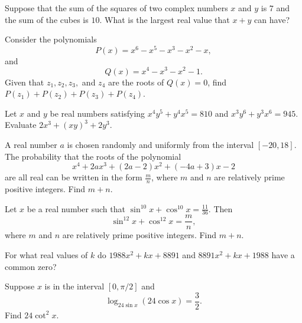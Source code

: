 \begin{question}[name={1983 AIME}]
    Suppose that the sum of the squares of two complex numbers $x$ and $y$ is $7$ and the sum of the cubes is $10$. What is the largest real value that $x + y$ can have?
\end{question}

\begin{question}[name={2003 AIME}]
    Consider the polynomials \[P(x)=x^{6}-x^{5}-x^{3}-x^{2}-x,\] and \[Q(x)=x^{4}-x^{3}-x^{2}-1.\] Given that $z_{1},z_{2},z_{3},$ and $z_{4}$ are the roots of $Q(x)=0$, find $P(z_{1})+P(z_{2})+P(z_{3})+P(z_{4})$.
\end{question}

\begin{question}[name={2015 AIME}]
    Let $x$ and $y$ be real numbers satisfying $x^4y^5+y^4x^5=810$ and $x^3y^6+y^3x^6=945$. Evaluate $2x^3+(xy)^3+2y^3$.	
\end{question}


\begin{question}[name={2018 AIME}]
    A real number $a$ is chosen randomly and uniformly from the interval $[-20, 18]$. The probability that the roots of the polynomial\[x^4 + 2ax^3 + (2a-2)x^2 + (-4a+3)x - 2\]are all real can be written in the form $\tfrac{m}{n}$, where $m$ and $n$ are relatively prime positive integers. Find $m+n$.
\end{question}

\begin{question}[name={2019 AIME}]
    Let $x$ be a real number such that $\sin^{10}x+\cos^{10} x = \tfrac{11}{36}$. Then 
    \[\sin^{12}x+\cos^{12} x = \dfrac{m}{n},\] where $m$ and $n$ are relatively prime positive integers. Find $m+n$.
\end{question}

\begin{question}[name={1988 Canada}]
    For what real values of $k$ do $1988x^2 + kx + 8891$ and $8891x^2 + kx + 1988$ have a common zero?
\end{question}

\begin{question}[name={2011 AIME I \#9}]
    Suppose $x$ is in the interval $[0,\pi/2]$ and \[\log_{24\sin{x}}(24\cos{x})=\frac{3}{2}.\] Find $24\cot^2{x}$.
\end{question}



